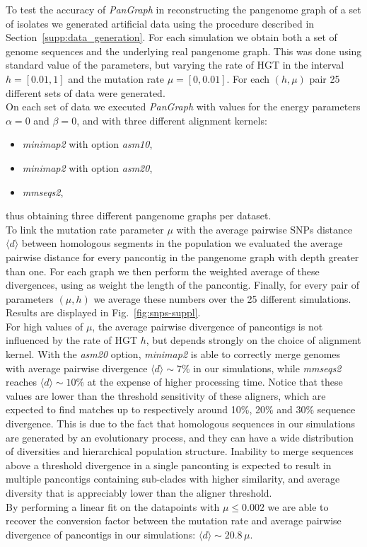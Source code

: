 \documentclass[aps,rmp,reprint,superscriptaddress,notitlepage,10pt,onecolumn]{revtex4-1}
\newcommand{\avg}[1]{\langle #1 \rangle}
\begin{document}
To test the accuracy of \textit{PanGraph} in reconstructing the pangenome graph of a set of isolates we generated artificial data using the procedure described in Section~\ref{supp:data_generation}. For each simulation we obtain both a set of genome sequences and the underlying real pangenome graph. This was done using standard value of the parameters, but varying the rate of HGT in the interval $h=[0.01,1]$ and the mutation rate $\mu=[0,0.01]$. For each $(h,\mu)$ pair 25 different sets of data were generated.\\
On each set of data we executed \textit{PanGraph} with values for the energy parameters $\alpha=0$ and $\beta=0$, and with three different alignment kernels:
\begin{itemize}
    \itemsep0pt
    \item \textit{minimap2} with option \textit{asm10},
    \item \textit{minimap2} with option \textit{asm20},
    \item \textit{mmseqs2},
\end{itemize}
thus obtaining three different pangenome graphs per dataset.\\
To link the mutation rate parameter $\mu$ with the average pairwise SNPs distance $\avg{d}$ between homologous segments in the population we evaluated the average pairwise distance for every pancontig in the pangenome graph with depth greater than one. For each graph we then perform the weighted average of these divergences, using as weight the length of the pancontig. Finally, for every pair of parameters $(\mu,h)$ we average these numbers over the 25 different simulations. Results are displayed in Fig.~\ref{fig:snps-suppl}.\\
For high values of $\mu$, the average pairwise divergence of pancontigs is not influenced by the rate of HGT $h$, but depends strongly on the choice of alignment kernel. With the \textit{asm20} option, \textit{minimap2} is able to correctly merge genomes with average pairwise divergence $\avg{d} \sim 7\%$ in our simulations, while \textit{mmseqs2} reaches $\avg{d} \sim 10\%$ at the expense of higher processing time. Notice that these values are lower than the threshold sensitivity of these aligners, which are expected to find matches up to respectively around 10\%, 20\% and 30\% sequence divergence. This is due to the fact that homologous sequences in our simulations are generated by an evolutionary process, and they can have a wide distribution of diversities and hierarchical population structure. Inability to merge sequences above a threshold divergence in a single panconting is expected to result in multiple pancontigs containing sub-clades with higher similarity, and average diversity that is appreciably lower than the aligner threshold.\\
By performing a linear fit on the datapoints with $\mu \leq 0.002$ we are able to recover the conversion factor between the mutation rate and average pairwise divergence of pancontigs in our simulations: $\avg{d} \sim 20.8 \, \mu$.
\end{document}
